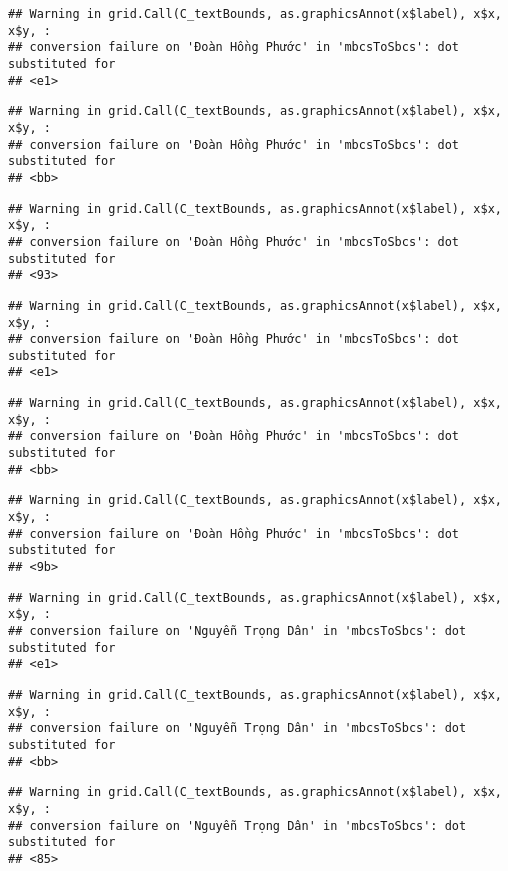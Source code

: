 \documentclass[
]{article}
\begin{document}
\begin{verbatim}
## Warning in grid.Call(C_textBounds, as.graphicsAnnot(x$label), x$x, x$y, :
## conversion failure on 'Đoàn Hồng Phước' in 'mbcsToSbcs': dot substituted for
## <e1>
\end{verbatim}

\begin{verbatim}
## Warning in grid.Call(C_textBounds, as.graphicsAnnot(x$label), x$x, x$y, :
## conversion failure on 'Đoàn Hồng Phước' in 'mbcsToSbcs': dot substituted for
## <bb>
\end{verbatim}

\begin{verbatim}
## Warning in grid.Call(C_textBounds, as.graphicsAnnot(x$label), x$x, x$y, :
## conversion failure on 'Đoàn Hồng Phước' in 'mbcsToSbcs': dot substituted for
## <93>
\end{verbatim}

\begin{verbatim}
## Warning in grid.Call(C_textBounds, as.graphicsAnnot(x$label), x$x, x$y, :
## conversion failure on 'Đoàn Hồng Phước' in 'mbcsToSbcs': dot substituted for
## <e1>
\end{verbatim}

\begin{verbatim}
## Warning in grid.Call(C_textBounds, as.graphicsAnnot(x$label), x$x, x$y, :
## conversion failure on 'Đoàn Hồng Phước' in 'mbcsToSbcs': dot substituted for
## <bb>
\end{verbatim}

\begin{verbatim}
## Warning in grid.Call(C_textBounds, as.graphicsAnnot(x$label), x$x, x$y, :
## conversion failure on 'Đoàn Hồng Phước' in 'mbcsToSbcs': dot substituted for
## <9b>
\end{verbatim}

\begin{verbatim}
## Warning in grid.Call(C_textBounds, as.graphicsAnnot(x$label), x$x, x$y, :
## conversion failure on 'Nguyễn Trọng Dân' in 'mbcsToSbcs': dot substituted for
## <e1>
\end{verbatim}

\begin{verbatim}
## Warning in grid.Call(C_textBounds, as.graphicsAnnot(x$label), x$x, x$y, :
## conversion failure on 'Nguyễn Trọng Dân' in 'mbcsToSbcs': dot substituted for
## <bb>
\end{verbatim}

\begin{verbatim}
## Warning in grid.Call(C_textBounds, as.graphicsAnnot(x$label), x$x, x$y, :
## conversion failure on 'Nguyễn Trọng Dân' in 'mbcsToSbcs': dot substituted for
## <85>
\end{verbatim}
\end{document}
